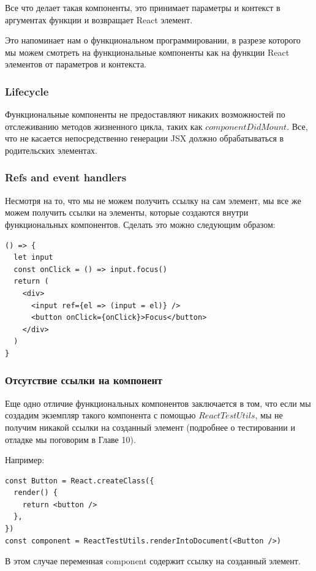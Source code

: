 Все что делает такая компоненты, это принимает параметры и контекст в аргументах функции и возвращает React элемент.

Это напоминает нам о функциональном программировании, в разрезе которого мы можем смотреть на функциональные компоненты как на функции React элементов от параметров и контекста.

\subsubsection{Lifecycle}

Функциональные компоненты не предоставляют никаких возможностей по отслеживанию методов жизненного цикла, таких как $componentDidMount$. Все, что не касается непосредственно генерации JSX должно обрабатываться в родительских элементах.

\subsubsection{Refs and event handlers}

Несмотря на то, что мы не можем получить ссылку на сам элемент, мы все же можем получить ссылки на элементы, которые создаются внутри функциональных компонентов. Сделать это можно следующим образом:

\begin{lstlisting}
() => {
  let input
  const onClick = () => input.focus()
  return (
    <div>
      <input ref={el => (input = el)} />
      <button onClick={onClick}>Focus</button>
    </div>
  ) 
}
\end{lstlisting}

\subsubsection{Отсутствие ссылки на компонент}

Еще одно отличие функциональных компонентов заключается в том, что если мы создадим экземпляр такого компонента с помощью $ReactTestUtils$, мы не получим никакой ссылки на созданный элемент (подробнее о тестировании и отладке мы поговорим в Главе 10).

Например:

\begin{lstlisting}
const Button = React.createClass({
  render() {
    return <button />
  },
})
const component = ReactTestUtils.renderIntoDocument(<Button />)
\end{lstlisting}

В этом случае переменная component содержит ссылку на созданный элемент.

